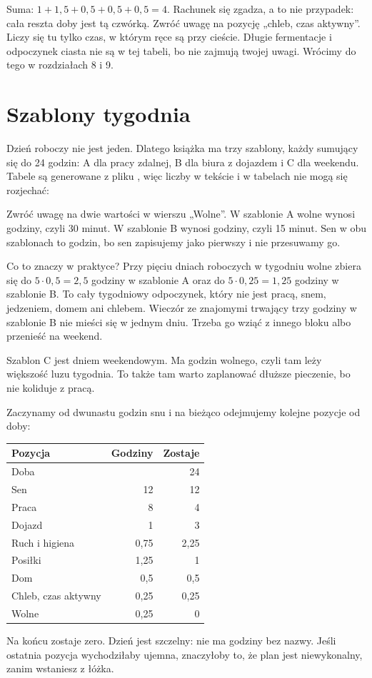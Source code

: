 Suma: $1 + 1{,}5 + 0{,}5 + 0{,}5 + 0{,}5 = 4$. Rachunek się zgadza, a to nie przypadek: cała reszta doby jest tą czwórką. Zwróć uwagę na pozycję „chleb, czas aktywny”. Liczy się tu tylko czas, w którym ręce są przy cieście. Długie fermentacje i odpoczynek ciasta nie są w tej tabeli, bo nie zajmują twojej uwagi. Wrócimy do tego w rozdziałach 8 i 9.

\section{Szablony tygodnia}

Dzień roboczy nie jest jeden. Dlatego książka ma trzy szablony, każdy sumujący się do 24 godzin: A dla pracy zdalnej, B dla biura z dojazdem i C dla weekendu. Tabele są generowane z pliku , więc liczby w tekście i w tabelach nie mogą się rozjechać:


Zwróć uwagę na dwie wartości w wierszu „Wolne”. W szablonie A wolne wynosi  godziny, czyli 30 minut. W szablonie B wynosi  godziny, czyli 15 minut. Sen w obu szablonach to  godzin, bo sen zapisujemy jako pierwszy i nie przesuwamy go.

Co to znaczy w praktyce? Przy pięciu dniach roboczych w tygodniu wolne zbiera się do $5 \cdot 0{,}5 = 2{,}5$ godziny w szablonie A oraz do $5 \cdot 0{,}25 = 1{,}25$ godziny w szablonie B. To cały tygodniowy odpoczynek, który nie jest pracą, snem, jedzeniem, domem ani chlebem. Wieczór ze znajomymi trwający trzy godziny w szablonie B nie mieści się w jednym dniu. Trzeba go wziąć z innego bloku albo przenieść na weekend.

Szablon C jest dniem weekendowym. Ma  godzin wolnego, czyli tam leży większość luzu tygodnia. To także tam warto zaplanować dłuższe pieczenie, bo nie koliduje z pracą.

\begin{przyklad}
Zaczynamy od dwunastu godzin snu i na bieżąco odejmujemy kolejne pozycje od doby:
\begin{tabular}{@{}lrr@{}}\toprule
Pozycja & Godziny & Zostaje\\\midrule
Doba & & 24\\
Sen & 12 & 12\\
Praca & 8 & 4\\
Dojazd & 1 & 3\\
Ruch i higiena & 0,75 & 2,25\\
Posiłki & 1,25 & 1\\
Dom & 0,5 & 0,5\\
Chleb, czas aktywny & 0,25 & 0,25\\
Wolne & 0,25 & 0\\\bottomrule
\end{tabular}

Na końcu zostaje zero. Dzień jest szczelny: nie ma godziny bez nazwy. Jeśli ostatnia pozycja wychodziłaby ujemna, znaczyłoby to, że plan jest niewykonalny, zanim wstaniesz z łóżka.
\end{przyklad}

